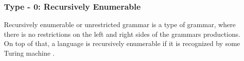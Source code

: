 \subsubsection{Type - 0: Recursively Enumerable}
Recursively enumerable or unrestricted grammar is a type of grammar, where there is no restrictions on the left and right sides of the grammars productions. On top of that, a language is recursively enumerable if it is recognized by some Turing machine \citep{sipser}.  %


